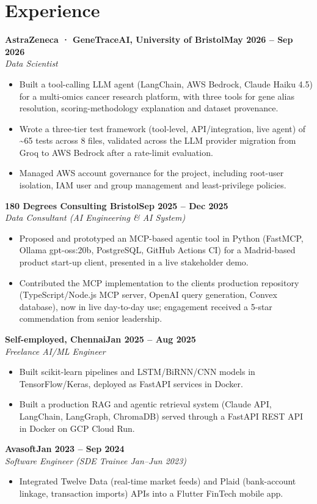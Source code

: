 \documentclass[a4paper,10pt]{article}
\newcommand{\entry}[4]{\noindent\textbf{#1}\hfill\textbf{#2}\\ \textit{#3}\hfill\textit{#4}\par}
\begin{document}
\section{Experience}
\entry{AstraZeneca · GeneTraceAI, University of Bristol}{May 2026 – Sep 2026}{Data Scientist}{}
\begin{itemize}
  \item Built a tool-calling LLM agent (LangChain, AWS Bedrock, Claude Haiku 4.5) for a multi-omics cancer research platform, with three tools for gene alias resolution, scoring-methodology explanation and dataset provenance.
  \item Wrote a three-tier test framework (tool-level, API/integration, live agent) of \textasciitilde{}65 tests across 8 files, validated across the LLM provider migration from Groq to AWS Bedrock after a rate-limit evaluation.
  \item Managed AWS account governance for the project, including root-user isolation, IAM user and group management and least-privilege policies.
\end{itemize}
\vspace{3pt}
\entry{180 Degrees Consulting Bristol}{Sep 2025 – Dec 2025}{Data Consultant (AI Engineering \& AI System)}{}
\begin{itemize}
  \item Proposed and prototyped an MCP-based agentic tool in Python (FastMCP, Ollama gpt-oss:20b, PostgreSQL, GitHub Actions CI) for a Madrid-based product start-up client, presented in a live stakeholder demo.
  \item Contributed the MCP implementation to the client\textquotesingle{}s production repository (TypeScript/Node.js MCP server, OpenAI query generation, Convex database), now in live day-to-day use; engagement received a 5-star commendation from senior leadership.
\end{itemize}
\vspace{3pt}
\entry{Self-employed, Chennai}{Jan 2025 – Aug 2025}{Freelance AI/ML Engineer}{}
\begin{itemize}
  \item Built scikit-learn pipelines and LSTM/BiRNN/CNN models in TensorFlow/Keras, deployed as FastAPI services in Docker.
  \item Built a production RAG and agentic retrieval system (Claude API, LangChain, LangGraph, ChromaDB) served through a FastAPI REST API in Docker on GCP Cloud Run.
\end{itemize}
\vspace{3pt}
\entry{Avasoft}{Jan 2023 – Sep 2024}{Software Engineer (SDE Trainee Jan–Jun 2023)}{}
\begin{itemize}
  \item Integrated Twelve Data (real-time market feeds) and Plaid (bank-account linkage, transaction imports) APIs into a Flutter FinTech mobile app.
\end{itemize}
\end{document}
